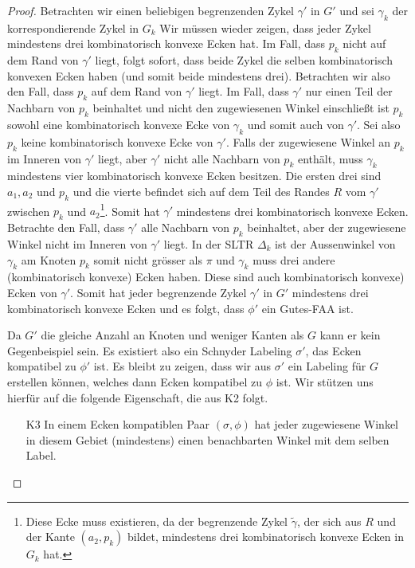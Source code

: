 \begin{proof}
Betrachten wir einen beliebigen begrenzenden Zykel $\gamma'$ in $G'$ und sei $\gamma_k$ der korrespondierende Zykel in $G_k$ Wir müssen wieder zeigen, dass jeder Zykel mindestens drei kombinatorisch konvexe Ecken hat. Im Fall, dass $p_k$ nicht auf dem Rand von $\gamma'$ liegt, folgt sofort, dass beide Zykel die selben kombinatorisch konvexen Ecken haben (und somit beide mindestens drei). Betrachten wir also den Fall, dass $p_k$ auf dem Rand von $\gamma'$ liegt. Im Fall, dass $\gamma'$ nur einen Teil der Nachbarn von $p_k$ beinhaltet und nicht den zugewiesenen Winkel einschließt ist $p_k$ sowohl eine kombinatorisch konvexe Ecke von $\gamma_k$ und somit auch von $\gamma'$. Sei also $p_k$ keine kombinatorisch konvexe Ecke von $\gamma'$. Falls der zugewiesene Winkel an $p_k$ im Inneren von $\gamma'$ liegt, aber $\gamma'$ nicht alle Nachbarn von $p_k$ enthält, muss $\gamma_k$ mindestens vier kombinatorisch konvexe Ecken besitzen. Die ersten drei sind $a_1,a_2$ und $p_k$ und die vierte befindet sich auf dem Teil des Randes $R$ vom $\gamma'$ zwischen $p_k$ und $a_2$\footnote{Diese Ecke muss existieren, da der begrenzende Zykel $\tilde{\gamma}$, der sich aus $R$ und der Kante $(a_2,p_k)$ bildet, mindestens drei kombinatorisch konvexe Ecken in $G_k$ hat.}. Somit hat $\gamma'$ mindestens drei kombinatorisch konvexe Ecken. Betrachte den Fall, dass $\gamma'$ alle Nachbarn von $p_k$ beinhaltet, aber der zugewiesene Winkel nicht im Inneren von $\gamma'$ liegt. In der SLTR $\Delta_k$ ist der Aussenwinkel von $\gamma_k$ am Knoten $p_k$ somit nicht grösser als $\pi$ und $\gamma_k$ muss drei andere (kombinatorisch konvexe) Ecken haben. Diese sind auch kombinatorisch konvexe) Ecken von $\gamma'$. Somit hat jeder begrenzende Zykel $\gamma'$ in $G'$ mindestens drei kombinatorisch konvexe Ecken und es folgt, dass $\phi'$ ein Gutes-FAA ist.

Da $G'$ die gleiche Anzahl an Knoten und weniger Kanten als $G$ kann er kein Gegenbeispiel sein. Es existiert also ein Schnyder Labeling $\sigma'$, das Ecken kompatibel zu $\phi'$ ist. Es bleibt zu zeigen, dass wir aus $\sigma'$ ein Labeling für $G$ erstellen können, welches dann Ecken kompatibel zu $\phi$ ist. Wir stützen uns hierfür auf die folgende Eigenschaft, die aus K2 folgt.

\begin{itemize} 
\item [K3] In einem Ecken kompatiblen Paar $(\sigma,\phi)$ hat jeder zugewiesene Winkel in diesem Gebiet (mindestens) einen benachbarten Winkel mit dem selben Label.
\end{itemize}


\end{proof}
